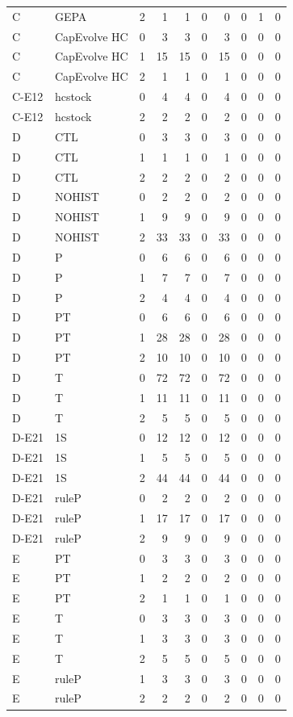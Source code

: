\begin{table}[t]
\begin{tabular}{@{}llrrrrrrrr@{}}
C & GEPA & 2 & 1 & 1 & 0 & 0 & 0 & 1 & 0 \\
C & CapEvolve HC & 0 & 3 & 3 & 0 & 3 & 0 & 0 & 0 \\
C & CapEvolve HC & 1 & 15 & 15 & 0 & 15 & 0 & 0 & 0 \\
C & CapEvolve HC & 2 & 1 & 1 & 0 & 1 & 0 & 0 & 0 \\
\midrule
C-E12 & hcstock & 0 & 4 & 4 & 0 & 4 & 0 & 0 & 0 \\
C-E12 & hcstock & 2 & 2 & 2 & 0 & 2 & 0 & 0 & 0 \\
\midrule
D & CTL & 0 & 3 & 3 & 0 & 3 & 0 & 0 & 0 \\
D & CTL & 1 & 1 & 1 & 0 & 1 & 0 & 0 & 0 \\
D & CTL & 2 & 2 & 2 & 0 & 2 & 0 & 0 & 0 \\
D & NOHIST & 0 & 2 & 2 & 0 & 2 & 0 & 0 & 0 \\
D & NOHIST & 1 & 9 & 9 & 0 & 9 & 0 & 0 & 0 \\
D & NOHIST & 2 & 33 & 33 & 0 & 33 & 0 & 0 & 0 \\
D & P & 0 & 6 & 6 & 0 & 6 & 0 & 0 & 0 \\
D & P & 1 & 7 & 7 & 0 & 7 & 0 & 0 & 0 \\
D & P & 2 & 4 & 4 & 0 & 4 & 0 & 0 & 0 \\
D & PT & 0 & 6 & 6 & 0 & 6 & 0 & 0 & 0 \\
D & PT & 1 & 28 & 28 & 0 & 28 & 0 & 0 & 0 \\
D & PT & 2 & 10 & 10 & 0 & 10 & 0 & 0 & 0 \\
D & T & 0 & 72 & 72 & 0 & 72 & 0 & 0 & 0 \\
D & T & 1 & 11 & 11 & 0 & 11 & 0 & 0 & 0 \\
D & T & 2 & 5 & 5 & 0 & 5 & 0 & 0 & 0 \\
\midrule
D-E21 & 1S & 0 & 12 & 12 & 0 & 12 & 0 & 0 & 0 \\
D-E21 & 1S & 1 & 5 & 5 & 0 & 5 & 0 & 0 & 0 \\
D-E21 & 1S & 2 & 44 & 44 & 0 & 44 & 0 & 0 & 0 \\
D-E21 & ruleP & 0 & 2 & 2 & 0 & 2 & 0 & 0 & 0 \\
D-E21 & ruleP & 1 & 17 & 17 & 0 & 17 & 0 & 0 & 0 \\
D-E21 & ruleP & 2 & 9 & 9 & 0 & 9 & 0 & 0 & 0 \\
\midrule
E & PT & 0 & 3 & 3 & 0 & 3 & 0 & 0 & 0 \\
E & PT & 1 & 2 & 2 & 0 & 2 & 0 & 0 & 0 \\
E & PT & 2 & 1 & 1 & 0 & 1 & 0 & 0 & 0 \\
E & T & 0 & 3 & 3 & 0 & 3 & 0 & 0 & 0 \\
E & T & 1 & 3 & 3 & 0 & 3 & 0 & 0 & 0 \\
E & T & 2 & 5 & 5 & 0 & 5 & 0 & 0 & 0 \\
E & ruleP & 1 & 3 & 3 & 0 & 3 & 0 & 0 & 0 \\
E & ruleP & 2 & 2 & 2 & 0 & 2 & 0 & 0 & 0 \\
\bottomrule
\end{tabular}
\end{table}

